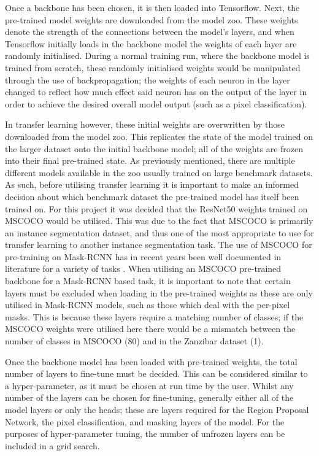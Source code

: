 Once a backbone has been chosen, it is then loaded into Tensorflow. Next, the pre-trained model weights are downloaded from the model zoo. These weights denote the strength of the connections between the model's layers, and when Tensorflow initially loads in the backbone model the weights of each layer are randomly initialised. During a normal training run, where the backbone model is trained from scratch, these randomly initialised weights would be manipulated through the use of backpropagation; the weights of each neuron in the layer changed to reflect how much effect said neuron has on the output of the layer in order to achieve the desired overall model output (such as a pixel classification). 

In transfer learning however, these initial weights are overwritten by those downloaded from the model zoo. This replicates the state of the model trained on the larger dataset onto the initial backbone model; all of the weights are frozen into their final pre-trained state. As previously mentioned, there are multiple different models available in the zoo usually trained on large benchmark datasets. As such, before utilising transfer learning it is important to make an informed decision about which benchmark dataset the pre-trained model has itself been trained on. For this project it was decided that the ResNet50 weights trained on MSCOCO would be utilised. This was due to the fact that MSCOCO is primarily an instance segmentation dataset, and thus one of the most appropriate to use for transfer learning to another instance segmentation task. The use of MSCOCO for pre-training on Mask-RCNN has in recent years been well documented in literature for a variety of tasks \cite{yu_fruit_2019, couteaux_automatic_2019, fujita_fine-tuned_2020}. When utilising an MSCOCO pre-trained backbone for a Mask-RCNN based task, it is important to note that certain layers must be excluded when loading in the pre-trained weights as these are only utilised in Mask-RCNN models, such as those which deal with the per-pixel masks. This is because these layers require a matching number of classes; if the MSCOCO weights were utilised here there would be a mismatch between the number of classes in MSCOCO (80) and in the Zanzibar dataset (1).

Once the backbone model has been loaded with pre-trained weights, the total number of layers to fine-tune must be decided. This can be considered similar to a hyper-parameter, as it must be chosen at run time by the user. Whilst any number of the layers can be chosen for fine-tuning, generally either all of the model layers or only the heads; these are layers required for the Region Proposal Network, the pixel classification, and masking layers of the model. For the purposes of hyper-parameter tuning, the number of unfrozen layers can be included in a grid search.

